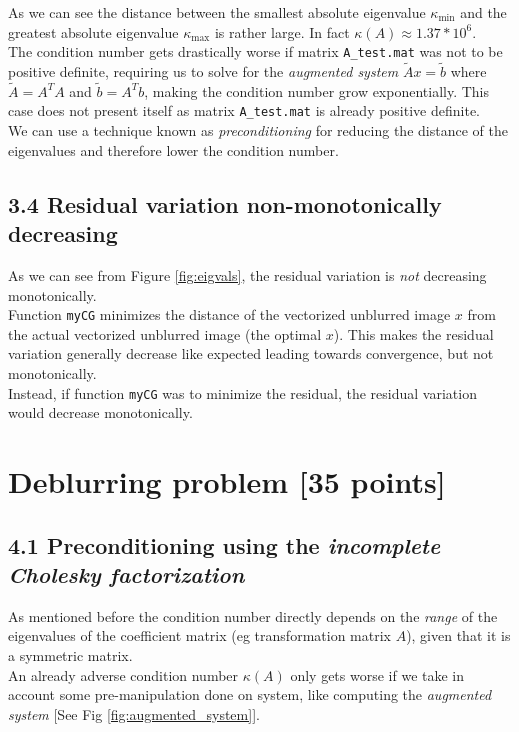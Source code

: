\documentclass[unicode,11pt,a4paper,oneside,numbers=endperiod,openany]{scrartcl}
\begin{document}
As we can see the distance between the smallest absolute eigenvalue $\kappa_{\text{min}}$ and the greatest absolute eigenvalue $\kappa_{\text{max}}$ is rather large. In fact $\kappa (A) \approx 1.37*10^6$.\\
The condition number gets drastically worse if matrix \verb|A_test.mat|  was not to be positive definite, requiring us to solve for the \textit{augmented system} $\tilde{A}x =  \tilde{b}$ where $\tilde{A} = A^TA$ and $\tilde{b} = A^Tb$, making the condition number grow exponentially. This case does not present itself as matrix \verb|A_test.mat| is already positive definite.\\
We can use a technique known as \textit{preconditioning} for reducing the distance of the eigenvalues and therefore lower the condition number.\\
\subsection*{3.4 Residual variation non-monotonically decreasing}
As we can see from Figure \ref{fig:eigvals}, the residual variation is \textit{not} decreasing monotonically. \\
Function \verb|myCG| minimizes the distance of the vectorized unblurred image $x$ from the actual vectorized unblurred image (the optimal $x$). This makes the residual variation generally decrease like expected leading towards convergence, but not monotonically.\\
Instead, if function \verb|myCG| was to minimize the residual, the residual variation would decrease monotonically.\\

\section{Deblurring problem [35 points]}
\subsection*{4.1 Preconditioning using the \textit{incomplete Cholesky factorization}}
As mentioned before the condition number directly depends on the \textit{range} of the eigenvalues of the coefficient matrix (eg transformation matrix $A$), given that it is a symmetric matrix.\\
An already adverse condition number $\kappa (A)$ only gets worse if we take in account some pre-manipulation done on system, like computing the \textit{augmented system} [See Fig \ref{fig:augmented_system}].\\\\
\end{document}
